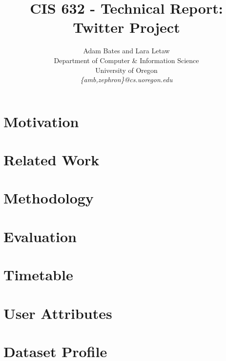 \documentclass[10pt,twocolumn]{IEEEtran11}
\begin{document}


\title{\Large \bf CIS 632 - Technical Report: Twitter Project
}

\author{Adam Bates and Lara Letaw\\
Department of Computer \& Information Science\\
University of Oregon\\
\textit{\{amb,zephron\}@cs.uoregon.edu}}

\maketitle


%

\section{Motivation}  


\section{Related Work}  


\section{Methodology}


\section{Evaluation}


\section{Timetable}


\onecolumn
\section{User Attributes}


\onecolumn
\section{Dataset Profile}


\twocolumn

\end{document}
